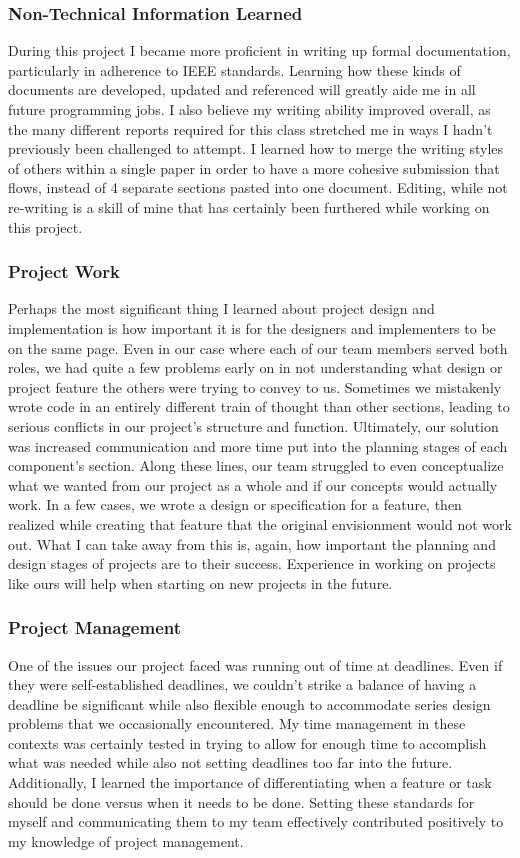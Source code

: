 \documentclass[letterpaper,10pt,titlepage,draftclsnofoot,onecolumn,onesided] {IEEEtran}
\begin{document}
\subsubsection{Non-Technical Information Learned}
During this project I became more proficient in writing up formal documentation, particularly in adherence to IEEE standards. 
Learning how these kinds of documents are developed, updated and referenced will greatly aide me in all future programming jobs.
I also believe my writing ability improved overall, as the many different reports required for this class stretched me in ways I hadn't previously been challenged to attempt.
I learned how to merge the writing styles of others within a single paper in order to have a more cohesive submission that flows, instead of 4 separate sections pasted into one document.
Editing, while not re-writing is a skill of mine that has certainly been furthered while working on this project.

\subsubsection{Project Work}
Perhaps the most significant thing I learned about project design and implementation is how important it is for the designers and implementers to be on the same page.
Even in our case where each of our team members served both roles, we had quite a few problems early on in not understanding what design or project feature the others were trying to convey to us.
Sometimes we mistakenly wrote code in an entirely different train of thought than other sections, leading to serious conflicts in our project's structure and function.
Ultimately, our solution was increased communication and more time put into the planning stages of each component's section.
Along these lines, our team struggled to even conceptualize what we wanted from our project as a whole and if our concepts would actually work.
In a few cases, we wrote a design or specification for a feature, then realized while creating that feature that the original envisionment would not work out.
What I can take away from this is, again, how important the planning and design stages of projects are to their success.
Experience in working on projects like ours will help when starting on new projects in the future.

\subsubsection{Project Management}
One of the issues our project faced was running out of time at deadlines. 
Even if they were self-established deadlines, we couldn't strike a balance of having a deadline be significant while also flexible enough to accommodate series design problems that we occasionally encountered.
My time management in these contexts was certainly tested in trying to allow for enough time to accomplish what was needed while also not setting deadlines too far into the future.
Additionally, I learned the importance of differentiating when a feature or task should be done versus when it needs to be done. 
Setting these standards for myself and communicating them to my team effectively contributed positively to my knowledge of project management.
\end{document}
